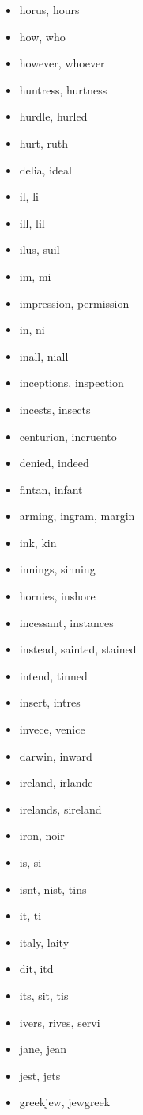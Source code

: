 \documentclass[a4wide,11pt]{report}
\begin{document}
\begin{itemize}
  \item horus, hours
  \item how, who
  \item however, whoever
  \item huntress, hurtness
  \item hurdle, hurled
  \item hurt, ruth
  \item delia, ideal
  \item il, li
  \item ill, lil
  \item ilus, suil
  \item im, mi
  \item impression, permission
  \item in, ni
  \item inall, niall
  \item inceptions, inspection
  \item incests, insects
  \item centurion, incruento
  \item denied, indeed
  \item fintan, infant
  \item arming, ingram, margin
  \item ink, kin
  \item innings, sinning
  \item hornies, inshore
  \item incessant, instances
  \item instead, sainted, stained
  \item intend, tinned
  \item insert, intres
  \item invece, venice
  \item darwin, inward
  \item ireland, irlande
  \item irelands, sireland
  \item iron, noir
  \item is, si
  \item isnt, nist, tins
  \item it, ti
  \item italy, laity
  \item dit, itd
  \item its, sit, tis
  \item ivers, rives, servi
  \item jane, jean
  \item jest, jets
  \item greekjew, jewgreek

\end{itemize}
\end{document}
